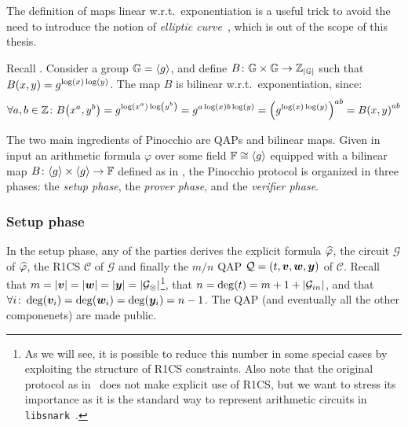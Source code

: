 The definition of maps linear w.r.t.\ exponentiation is a useful trick to avoid the need to 
introduce the notion of \emph{elliptic curve}~\cite{Silverman2009}, which is out of the scope 
of this thesis.

\begin{example}\label{ex:bilinear_map}
  Recall .
  Consider a group \(\mathbb{G} = \left\langle g\right\rangle\), and define 
  \(B\colon \mathbb{G} \times \mathbb{G} \to \mathbb{Z}_{\left\lvert\mathbb{G}\right\rvert}\) such that 
  \(\call{B}{x, y} = g^{\call{\log}{x}\call{\log}{y}}\). The map \(B\) is bilinear 
  w.r.t.\ exponentiation, since:
  \[
    \forall a,b \in \mathbb{Z}\colon \call{B}{x^a, y^b} = g^{\call{\log}{x^a}\call{\log}{y^b}} = 
    g^{a\call{\log}{x}b\call{\log}{y}} = \Parens*{g^{\call{\log}{x}\call{\log}{y}}}^{ab}
    = \call{B}{x, y}^{ab}
  \]
\end{example}

The two main ingredients of Pinocchio are QAPs and bilinear maps.
Given in input an arithmetic formula \(\varphi \) over some field \(\mathbb{F} \cong \left\langle g\right\rangle\) 
equipped with a bilinear map \(B\colon \gengroup{g} \times \gengroup{g} \to \mathbb{F}\) defined as 
in , the Pinocchio protocol is organized in three phases: the 
\emph{setup phase}, the \emph{prover phase}, and the \emph{verifier phase}.

\subsubsection*{Setup phase}
In the setup phase, any of the parties derives the explicit formula \(\widehat{\varphi}\), 
the circuit \(\mathcal{G}\) of \(\widehat{\varphi}\), the R1CS \(\mathcal{C}\) of \(\mathcal{G}\) 
and finally the \(m/n\) QAP \(\mathcal{Q} = \left(t, \bm{v}, \bm{w}, \bm{y}\right)\) of \(\mathcal{C}\).
Recall that \(m = \left\lvert\bm{v}\right\rvert = \left\lvert\bm{w}\right\rvert = \left\lvert\bm{y}\right\rvert = \left\lvert\mathcal{G}_{\otimes}\right\rvert\)\footnote{
  As we will see, it is possible to reduce this number in some special cases by exploiting the 
  structure of R1CS constraints.
  Also note that the original protocol as in~\cite{ParnoGHR2013} does not make explicit use of 
  R1CS, but we want to stress its importance as it is the standard way to represent arithmetic 
  circuits in \texttt{libsnark}~\cite{SassonCTV2013}.
  }, 
that \(n = \call{\deg}{t} = m + 1 + \abs{\mathcal{G}_{in}}\), and that 
\(\forall i\colon \call{\deg}{\bm{v}_i} = \call{\deg}{\bm{w}_i} = \call{\deg}{\bm{y}_i} = n - 1\).
The QAP (and eventually all the other componenets) are made public.

